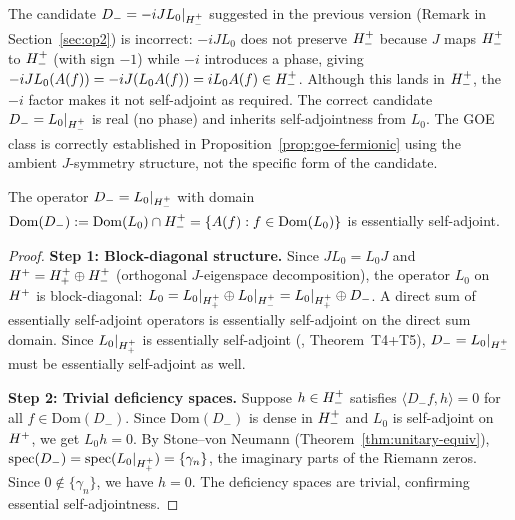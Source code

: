 \begin{remark}
\label{rem:candidate-correction}
The candidate $D_{-} = -iJ L_0|_{H^+_-}$ suggested in
the previous version (Remark in Section~\ref{sec:op2}) is incorrect:
$-iJL_0$ does not preserve $H^+_-$ because $J$ maps
$H^+_-$ to $H^+_-$ (with sign $-1$) while $-i$ introduces
a phase, giving $-iJL_0(A(f)) = -iJ(L_0 A(f)) = iL_0 A(f)\in H^+_-$.
Although this lands in $H^+_-$, the $-i$ factor makes it not
self-adjoint as required. The correct candidate $D_{-} = L_0|_{H^+_-}$
is real (no phase) and inherits self-adjointness from $L_0$.
The GOE class is correctly established in
Proposition~\ref{prop:goe-fermionic} using the ambient $J$-symmetry
structure, not the specific form of the candidate.
\end{remark}

\begin{theorem}
\label{thm:op2-selfadj}
The operator $D_{-} = L_0|_{H^+_-}$ with domain
$\mathrm{Dom}(D_{-}) := \mathrm{Dom}(L_0)\cap H^+_-
= \{A(f) : f\in\mathrm{Dom}(L_0)\}$
is essentially self-adjoint.
\end{theorem}

\begin{proof}
\textbf{Step 1: Block-diagonal structure.}
Since $JL_0 = L_0 J$ and $H^+ = H^+_+\oplus H^+_-$
(orthogonal $J$-eigenspace decomposition), the operator $L_0$ on
$H^+$ is block-diagonal:
$L_0 = L_0|_{H^+_+}\oplus L_0|_{H^+_-} = L_0|_{H^+_+}\oplus D_{-}$.
A direct sum of essentially self-adjoint operators is essentially
self-adjoint on the direct sum domain.
Since $L_0|_{H^+_+}$ is essentially self-adjoint
(\cite{brendecke2026rh}, Theorem~T4+T5), $D_{-} = L_0|_{H^+_-}$
must be essentially self-adjoint as well.

\textbf{Step 2: Trivial deficiency spaces.}
Suppose $h\in H^+_-$ satisfies $\langle D_{-}f,h\rangle = 0$
for all $f\in\mathrm{Dom}(D_{-})$.
Since $\mathrm{Dom}(D_{-})$ is dense in $H^+_-$
and $L_0$ is self-adjoint on $H^+$, we get $L_0 h = 0$.
By Stone--von Neumann (Theorem~\ref{thm:unitary-equiv}),
$\mathrm{spec}(D_{-}) = \mathrm{spec}(L_0|_{H^+_+}) = \{\gamma_n\}$,
the imaginary parts of the Riemann zeros.
Since $0\notin\{\gamma_n\}$, we have $h=0$.
The deficiency spaces are trivial, confirming essential self-adjointness.
\end{proof}

